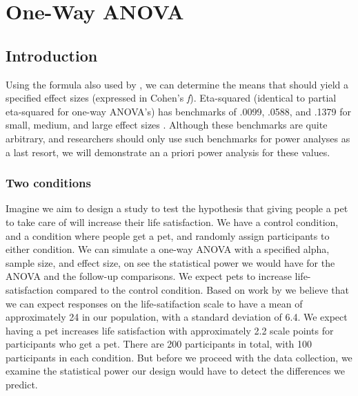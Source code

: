 \documentclass[
]{book}
\begin{document}
\hypertarget{one-way-anova}{%
\chapter{One-Way ANOVA}\label{one-way-anova}}

\hypertarget{introduction}{%
\section{Introduction}\label{introduction}}

Using the formula also used by \citet{albers2018power}, we can determine the means that should yield a specified effect sizes (expressed in Cohen's \emph{f}). Eta-squared (identical to partial eta-squared for one-way ANOVA's) has benchmarks of .0099, .0588, and .1379 for small, medium, and large effect sizes \citep{cohen1988spa}. Although these benchmarks are quite arbitrary, and researchers should only use such benchmarks for power analyses as a last resort, we will demonstrate an a priori power analysis for these values.

\hypertarget{two-conditions}{%
\subsection{Two conditions}\label{two-conditions}}

Imagine we aim to design a study to test the hypothesis that giving people a pet to take care of will increase their life satisfaction. We have a control condition, and a condition where people get a pet, and randomly assign participants to either condition. We can simulate a one-way ANOVA with a specified alpha, sample size, and effect size, on see the statistical power we would have for the ANOVA and the follow-up comparisons. We expect pets to increase life-satisfaction compared to the control condition. Based on work by \citet{pavot1993affective} we believe that we can expect responses on the life-satifaction scale to have a mean of approximately 24 in our population, with a standard deviation of 6.4. We expect having a pet increases life satisfaction with approximately 2.2 scale points for participants who get a pet. There are 200 participants in total, with 100 participants in each condition. But before we proceed with the data collection, we examine the statistical power our design would have to detect the differences we predict.
\end{document}

